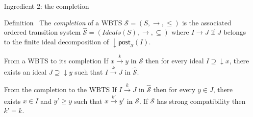 \documentclass{beamer}
\newcommand{\post}{\textsf{post}}
\begin{document}
  \begin{frame}{Ingredient 2: the completion}
 
 
 \begin{block}{Definition~\cite{BFM-ic17}}
The \emph{completion}   of a WBTS $\mathscr{S}=(S,\rightarrow, \leq)$ is the associated ordered transition system $\hat{\mathscr{S}}=(Ideals(S),\rightarrow, \subseteq)$ where 
 $I \rightarrow J$ if $J$ belongs to the finite ideal decomposition of $\mathop{\downarrow} \post_{\mathscr{S}}(I)$. 
\end{block}



\pause

\begin{exampleblock}{From a WBTS to its completion}
If $x \xrightarrow{k} y$ in $\mathscr{S}$ then for every ideal $I \supseteq \mathop{\downarrow} x$, there exists an ideal $J \supseteq \mathop{\downarrow} y$ such that $I \xrightarrow{k} J$ in $\hat{\mathscr{S}}$.
\end{exampleblock}


\pause

\begin{exampleblock}{From the completion to the WBTS}
If $I \xrightarrow{k} J$ in $\hat{\mathscr{S}}$ then for every $y \in J$, there exists $x \in I$ and $y' \geq y$ such that $x \xrightarrow{k'} y'$ in $\mathscr{S}$. If $\mathscr{S}$ has strong compatibility then $k’ = k$.
\end{exampleblock}



 
  

  \end{frame}
\end{document}
